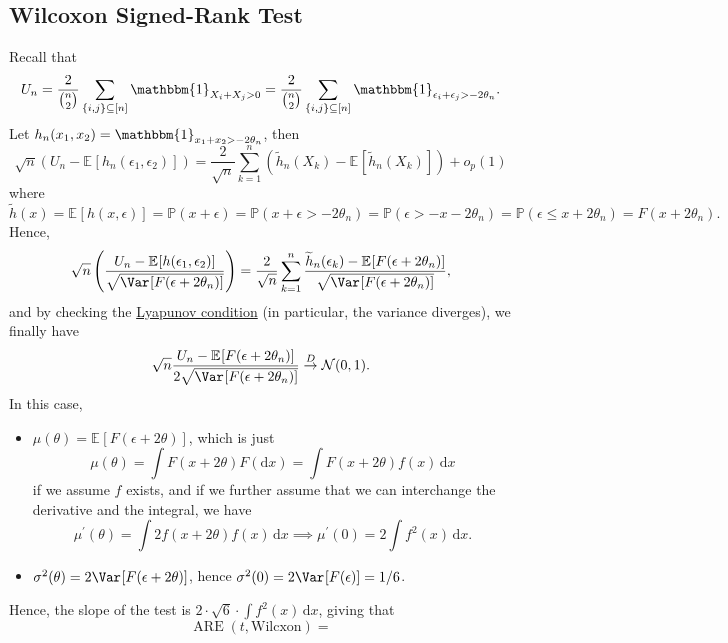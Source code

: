\subsection{Wilcoxon Signed-Rank Test}
Recall that
\[
	U_n
	= \frac{2}{\binom{n}{2}} \sum_{\{ i, j \} \subseteq [n]} \mathbbm{1}_{X_i + X_j > 0}
	= \frac{2}{\binom{n}{2}} \sum_{\{ i, j \} \subseteq [n]} \mathbbm{1}_{\epsilon _i + \epsilon _j > - 2 \theta _n}.
\]
Let \(h_n(x_1, x_2) = \mathbbm{1}_{x_1 + x_2 > - 2 \theta _n} \), then
\[
	\sqrt{n} \left( U_n - \mathbb{E}_{}[h_n(\epsilon _1, \epsilon _2)] \right)
	= \frac{2}{\sqrt{n} } \sum_{k=1}^{n} \left( \widetilde{h} _n(X_k) - \mathbb{E}_{}[\widetilde{h} _n(X_k)] \right) + o_p(1)
\]
where
\[
	\widetilde{h} (x)
	= \mathbb{E}_{}[h(x, \epsilon )] = \mathbb{P} (x + \epsilon )
	= \mathbb{P} (x + \epsilon > - 2\theta _n)
	= \mathbb{P} (\epsilon > -x - 2\theta _n)
	= \mathbb{P} (\epsilon \leq x + 2 \theta _n)
	= F(x + 2 \theta _n).
\]
Hence,
\[
	\sqrt{n} \left( \frac{U_n - \mathbb{E}_{}[h(\epsilon _1 , \epsilon _2)]}{\sqrt{\Var_{}[F(\epsilon + 2 \theta _n)] } } \right)
	= \frac{2}{\sqrt{n} } \sum_{k=1}^{n} \frac{\widetilde{h} _n(\epsilon _k) - \mathbb{E}_{}[F(\epsilon + 2 \theta _n)] }{\sqrt{\Var_{}[F(\epsilon + 2 \theta _n)] } },
\]
and by checking the \hyperref[col:Lyapunov-CLT]{Lyapunov condition} (in particular, the variance diverges), we finally have
\[
	\sqrt{n} \frac{U_n - \mathbb{E}_{}[F(\epsilon + 2 \theta _n)] }{2 \sqrt{\Var_{}[F(\epsilon + 2 \theta _n)] } }
	\overset{D}{\to} \mathcal{N} (0, 1).
\]
In this case,
\begin{itemize}
	\item \(\mu (\theta ) = \mathbb{E}_{}[F(\epsilon + 2 \theta )] \), which is just
	      \[
		      \mu (\theta ) = \int F(x + 2 \theta ) F(\mathrm{d} x)
		      = \int F(x + 2 \theta ) f(x) \,\mathrm{d} x
	      \]
	      if we assume \(f\) exists, and if we further assume that we can interchange the derivative and the integral, we have
	      \[
		      \mu ^{\prime} (\theta )
		      = \int 2 f(x + 2\theta ) f(x) \,\mathrm{d} x
		      \implies \mu ^{\prime} (0) = 2 \int f^2(x) \,\mathrm{d} x .
	      \]
	\item \(\sigma ^2(\theta ) = 2 \Var_{}[F(\epsilon + 2 \theta )] \), hence \(\sigma ^2(0) = 2 \Var_{}[F(\epsilon )] = 1 / 6\).
\end{itemize}
Hence, the slope of the test is \(2 \cdot \sqrt{6} \cdot \int f^2(x) \,\mathrm{d} x\), giving that
\[
	\operatorname{ARE}(t, \text{Wilcxon} )
	=
\]